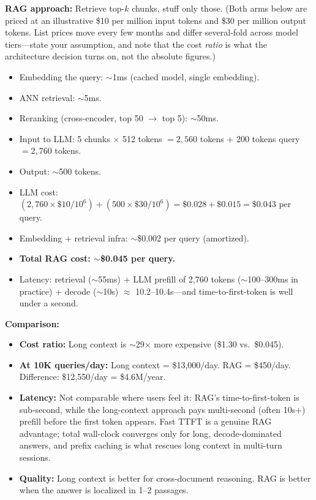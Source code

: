 \begin{interviewq}
\textbf{RAG approach:} Retrieve top-$k$ chunks, stuff only those. (Both arms below are priced at an
illustrative \$10 per million input tokens and \$30 per million output tokens. List prices move every
few months and differ several-fold across model tiers---state your assumption, and note that the cost
\emph{ratio} is what the architecture decision turns on, not the absolute figures.)
\begin{itemize}
    \item Embedding the query: $\sim$1ms (cached model, single embedding).
    \item ANN retrieval: $\sim$5ms.
    \item Reranking (cross-encoder, top 50 $\rightarrow$ top 5): $\sim$50ms.
    \item Input to LLM: 5 chunks $\times$ 512 tokens $= 2{,}560$ tokens + 200 tokens query $= 2{,}760$ tokens.
    \item Output: $\sim$500 tokens.
    \item LLM cost: $(2{,}760 \times \$10/10^6) + (500 \times \$30/10^6) = \$0.028 + \$0.015 = \$0.043$ per query.
    \item Embedding + retrieval infra: $\sim$\$0.002 per query (amortized).
    \item \textbf{Total RAG cost: $\sim$\$0.045 per query.}
    \item Latency: retrieval ($\sim$55ms) + LLM prefill of 2,760 tokens ($\sim$100--300ms in practice) + decode ($\sim$10s) $\approx$ 10.2--10.4s---and time-to-first-token is well under a second.
\end{itemize}

\textbf{Comparison:}
\begin{itemize}
    \item \textbf{Cost ratio:} Long context is $\sim$29$\times$ more expensive (\$1.30 vs.\ \$0.045).
    \item \textbf{At 10K queries/day:} Long context = \$13,000/day. RAG = \$450/day. Difference: \$12,550/day = \$4.6M/year.
    \item \textbf{Latency:} Not comparable where users feel it: RAG's time-to-first-token is sub-second, while the long-context approach pays multi-second (often 10s+) prefill before the first token appears. Fast TTFT is a genuine RAG advantage; total wall-clock converges only for long, decode-dominated answers, and prefix caching is what rescues long context in multi-turn sessions.
    \item \textbf{Quality:} Long context is better for cross-document reasoning. RAG is better when the answer is localized in 1--2 passages.
\end{itemize}


\end{interviewq}
